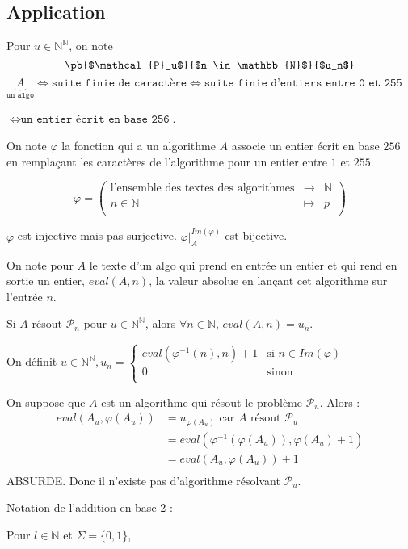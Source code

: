 \documentclass{scrartcl}
\begin{document}
		\subsection{Application}

			Pour $u \in \mathbb{N}^{\mathbb{N}}$, on note
			\[
				\pb{$\mathcal{P}_u$}{$n \in \mathbb{N}$}{$u_n$}
			\]
			$\underbrace{A}_{\texttt{un algo}} \iff \texttt{suite finie de caractère} 
			\iff \texttt{suite finie d'entiers entre 0 et 255}$

			$\iff \texttt{un entier écrit en base 256}$.

			On note $\varphi$ la fonction qui a un algorithme $A$ associe un entier écrit en base $256$ 
			en remplaçant les caractères de l'algorithme pour un entier entre $1$ et $255$.

			\[
			\varphi = \left( \begin{array}{ccc}
			\textrm{l'ensemble des textes des algorithmes} & \to & \mathbb{N} \\
			n \in \mathbb{N} & \mapsto & p \\
			\end{array} \right)
			\]

			$\varphi$ est injective mais pas surjective. $\varphi \Big|_{A}^{Im(\varphi)}$ est bijective.

			On note pour $A$ le texte d'un algo qui prend en entrée un entier et qui rend en sortie un entier, $eval(A,n)$, la valeur
			absolue en lançant cet algorithme sur l'entrée $n$.

			\rem Si $A$ résout $\mathcal{P}_n$ pour $u \in \mathbb{N}^{\mathbb{N}}$, alors $\forall n \in \mathbb{N}$, 
			$eval(A,n) = u_n$.


			On définit $u \in \mathbb{N}^{\mathbb{N}}, u_n = \left\{ 
			\begin{array}{ll} eval(\varphi^{-1}(n),n)+1 & \mbox{si } n \in Im(\varphi) \\
			0 & \mbox{sinon} \\
			\end{array} \right. $


			On suppose que $A$ est un algorithme qui résout le problème $\mathcal{P}_u$. Alors :
			\begin{align*}
				eval(A_u, \varphi(A_u)) &= u_{\varphi(A_u)} \mbox{	car } A \mbox{ résout } \mathcal{P}_u \\
				&= eval(\varphi^{-1} (\varphi(A_u)), \varphi(A_u)+1) \\
				&= eval(A_u, \varphi(A_u)) +1 \\
			\end{align*}
			ABSURDE. Donc il n'existe pas d'algorithme résolvant $\mathcal{P}_u$.

			\underline{Notation de l'addition en base 2 :}

			Pour $l \in \mathbb{N}$ et $\Sigma = \{0,1\}$,
				
\end{document}
